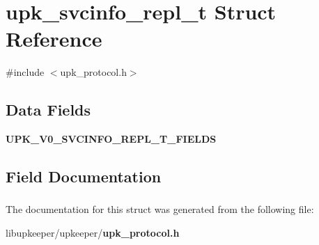 \section{upk\_\-svcinfo\_\-repl\_\-t Struct Reference}
\label{structupk__svcinfo__repl__t}


{\ttfamily \#include $<$upk\_\-protocol.h$>$}

\subsection*{Data Fields}
\begin{DoxyCompactItemize}
\item 
{\bf UPK\_\-V0\_\-SVCINFO\_\-REPL\_\-T\_\-FIELDS}
\end{DoxyCompactItemize}


\subsection{Field Documentation}
\subsubsection[{UPK\_\-V0\_\-SVCINFO\_\-REPL\_\-T\_\-FIELDS}]{}\label{structupk__svcinfo__repl__t_a738b910b4a2aa657038638b49be02dcb}


The documentation for this struct was generated from the following file:\begin{DoxyCompactItemize}
\item 
libupkeeper/upkeeper/{\bf upk\_\-protocol.h}\end{DoxyCompactItemize}
